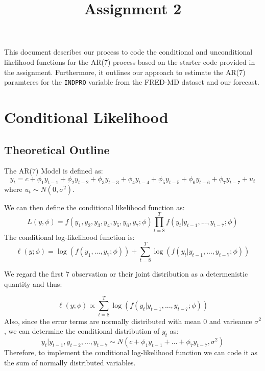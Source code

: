 \documentclass{article}
\title{Assignment 2}
\begin{document}
\maketitle

This document describes our process to code the conditional and unconditional likelihood functions for the AR(7) process based on the starter code provided in the assignment.
Furthermore, it outlines our approach to estimate the AR(7) paramteres for the \texttt{INDPRO} variable from the FRED-MD dataset and our forecast.

\tableofcontents

\section{Conditional Likelihood}
\subsection{Theoretical Outline}
The AR(7) Model is defined as:
\begin{equation}
y_t = c + \phi_1 y_{t-1} + \phi_2 y_{t-2} + \phi_3 y_{t-3} + \phi_4 y_{t-4} + \phi_5 y_{t-5} + \phi_6 y_{t-6} + \phi_7 y_{t-7} + u_t
\end{equation}
where $u_t \sim N(0, \sigma^2)$.

We can then define the conditional likelihood function as:
\begin{equation}
L(y,\phi) = f(y_1, y_2, y_3, y_4, y_5, y_6, y_7;\phi)\prod_{t=8}^Tf(y_t|y_{t-1},..., y_{t-7};\phi)
\end{equation}
The conditional log-likelihood function is:
\begin{equation}
\ell (y; \phi) = \log( f(y_1,..., y_7;\phi))+\sum_{t=8}^T \log (f(y_t|y_{t-1},..., y_{t-7};\phi))
\end{equation}

We regard the first 7 observation or their joint distribution as a determenistic quantity and thus:

\begin{equation}
\ell (y; \phi) \propto \sum_{t=8}^T \log(f(y_t|y_{t-1},..., y_{t-7};\phi))
\end{equation}
Also, since the error terms are normally distributed with mean 0 and varieance $\sigma^2$, we can determine the conditional distribution of $y_t$ as:
\begin{equation}
y_t|y_{t-1},y_{t-2}, ..., y_{t-7} \sim N(c + \phi_1y_{t-1} + ... + \phi_7 y_{t-7}, \sigma^2)
\end{equation}
Therefore, to implement the conditional log-likelihood function we can code it as the sum of normally distributed variables.
\end{document}
